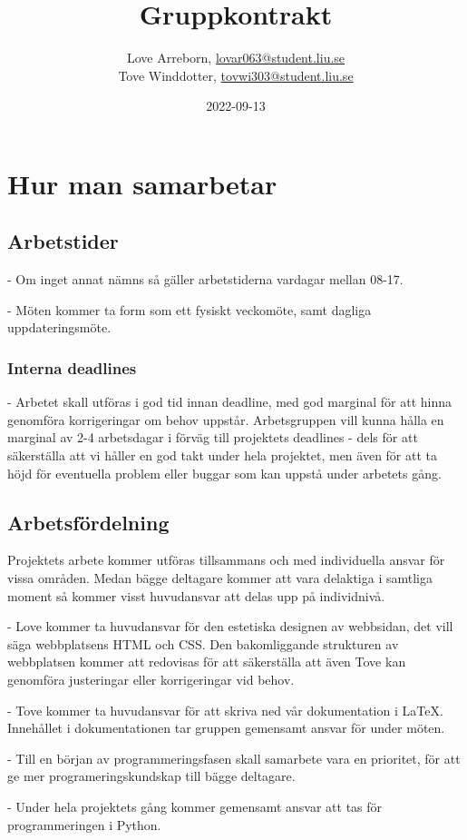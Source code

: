 \documentclass{mall}
\author{Love Arreborn, \url{lovar063@student.liu.se}\\
  Tove Winddotter, \url{tovwi303@student.liu.se}}
\title{Gruppkontrakt}
\date{2022-09-13}
\begin{document}
\projectpage

\section{Hur man samarbetar}

\subsection{Arbetstider}

- Om inget annat nämns så gäller arbetstiderna vardagar mellan 08-17.

- Möten kommer ta form som ett fysiskt veckomöte, samt dagliga uppdateringsmöte.

\subsubsection{Interna deadlines}
- Arbetet skall utföras i god tid innan deadline, med god marginal för att hinna genomföra korrigeringar om behov uppstår. Arbetsgruppen vill kunna hålla en marginal av 2-4 arbetsdagar i förväg till projektets deadlines - dels för att säkerställa att vi håller en god takt under hela projektet, men även för att ta höjd för eventuella problem eller buggar som kan uppstå under arbetets gång.

\subsection{Arbetsfördelning}
Projektets arbete kommer utföras tillsammans och med individuella ansvar för vissa områden. Medan bägge deltagare kommer att vara delaktiga i samtliga moment så kommer visst huvudansvar att delas upp på individnivå.

- Love kommer ta huvudansvar för den estetiska designen av webbsidan, det vill säga webbplatsens HTML och CSS. Den bakomliggande strukturen av webbplatsen kommer att redovisas för att säkerställa att även Tove kan genomföra justeringar eller korrigeringar vid behov.

- Tove kommer ta huvudansvar för att skriva ned vår dokumentation i LaTeX. Innehållet i dokumentationen tar gruppen gemensamt ansvar för under möten.

- Till en början av programmeringsfasen skall samarbete vara en prioritet, för att ge mer programeringskundskap till bägge deltagare.

- Under hela projektets gång kommer gemensamt ansvar att tas för programmeringen i Python.
\end{document}
